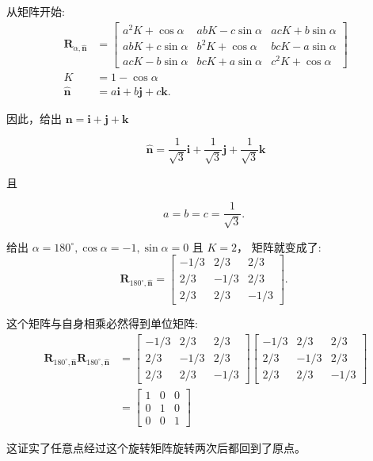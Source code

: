 从矩阵开始:
$$
\begin{aligned}
\mathbf{R}_{\alpha, \hat{\mathbf{n}}} & =\left[\begin{array}{ccc}
a^{2} K+\cos \alpha & a b K-c \sin \alpha & a c K+b \sin \alpha \\
a b K+c \sin \alpha & b^{2} K+\cos \alpha & b c K-a \sin \alpha \\
a c K-b \sin \alpha & b c K+a \sin \alpha & c^{2} K+\cos \alpha
\end{array}\right] \\
K & =1-\cos \alpha \\
\hat{\mathbf{n}} & =a \mathbf{i}+b \mathbf{j}+c \mathbf{k} .
\end{aligned}
$$

因此，给出 $\mathbf{n}=\mathbf{i}+\mathbf{j}+\mathbf{k}$

$$
\hat{\mathbf{n}}=\frac{1}{\sqrt{3}} \mathbf{i}+\frac{1}{\sqrt{3}} \mathbf{j}+\frac{1}{\sqrt{3}} \mathbf{k}
$$

且

$$
a=b=c=\frac{1}{\sqrt{3}} \text {. }
$$

给出 $\alpha=180^{\circ}, \cos \alpha=-1, \sin \alpha=0$ 且 $K=2$， 矩阵就变成了:
$$
\mathbf{R}_{180^{\circ}, \hat{\mathbf{n}}}=\left[\begin{array}{ccc}
-1 / 3 & 2 / 3 & 2 / 3 \\
2 / 3 & -1 / 3 & 2 / 3 \\
2 / 3 & 2 / 3 & -1 / 3
\end{array}\right] \text {. }
$$

这个矩阵与自身相乘必然得到单位矩阵:
$$
\begin{aligned}
\mathbf{R}_{180^{\circ}, \hat{\mathbf{n}}} \mathbf{R}_{180^{\circ}, \hat{\mathbf{n}}} & =\left[\begin{array}{ccc}
-1 / 3 & 2 / 3 & 2 / 3 \\
2 / 3 & -1 / 3 & 2 / 3 \\
2 / 3 & 2 / 3 & -1 / 3
\end{array}\right]\left[\begin{array}{ccc}
-1 / 3 & 2 / 3 & 2 / 3 \\
2 / 3 & -1 / 3 & 2 / 3 \\
2 / 3 & 2 / 3 & -1 / 3
\end{array}\right] \\
& =\left[\begin{array}{ccc}
1 & 0 & 0 \\
0 & 1 & 0 \\
0 & 0 & 1
\end{array}\right]
\end{aligned}
$$

这证实了任意点经过这个旋转矩阵旋转两次后都回到了原点。
